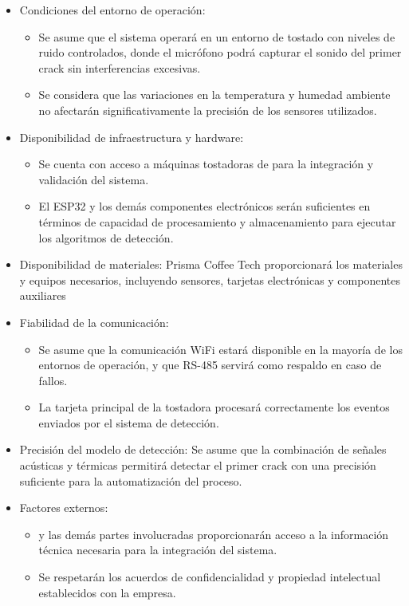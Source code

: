 \documentclass[
11pt, %
]{charter}
\begin{document}
\begin{itemize}
	\item Condiciones del entorno de operación:
		\begin{itemize}
			\item Se asume que el sistema operará en un entorno de tostado con niveles de ruido 				controlados, donde el micrófono podrá capturar el sonido del primer crack sin 					interferencias excesivas.
			
			\item Se considera que las variaciones en la temperatura y humedad ambiente no 					afectarán significativamente la precisión de los sensores utilizados.
		\end{itemize}
	
	\item Disponibilidad de infraestructura y hardware:
		\begin{itemize}
			\item Se cuenta con acceso a máquinas tostadoras de \empclientename para la 						integración y validación del sistema.
			
			\item El ESP32 y los demás componentes electrónicos serán suficientes en términos de 				capacidad de procesamiento y almacenamiento para ejecutar los algoritmos de 						detección.
		\end{itemize}
	
	\item Disponibilidad de materiales:
		Prisma Coffee Tech proporcionará los materiales y equipos necesarios, incluyendo 					sensores, tarjetas electrónicas y componentes auxiliares
	
	\item Fiabilidad de la comunicación:
		\begin{itemize}
			\item Se asume que la comunicación WiFi estará disponible en la mayoría de los 					entornos de operación, y que RS-485 servirá como respaldo en caso de fallos.
			
			\item La tarjeta principal de la tostadora procesará correctamente los eventos 					enviados por el sistema de detección.
		\end{itemize}
	
	\item Precisión del modelo de detección:
		Se asume que la combinación de señales acústicas y térmicas permitirá detectar 					el primer crack con una precisión suficiente para la automatización del proceso.
	
	\item Factores externos:
		\begin{itemize}
			\item \empclientename y las demás partes involucradas proporcionarán acceso a la 					información técnica necesaria para la integración del sistema.
			
			\item Se respetarán los acuerdos de confidencialidad y propiedad intelectual 						establecidos con la empresa.
		\end{itemize}
	
\end{itemize}
\end{document}
